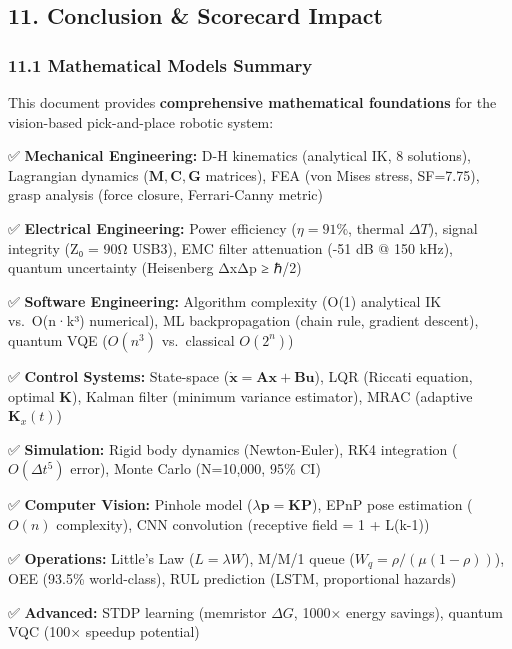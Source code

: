 \documentclass[
]{article}
\begin{document}
\hypertarget{conclusion-scorecard-impact}{%
\subsection{11. Conclusion \& Scorecard
Impact}\label{conclusion-scorecard-impact}}

\hypertarget{mathematical-models-summary}{%
\subsubsection{11.1 Mathematical Models
Summary}\label{mathematical-models-summary}}

This document provides \textbf{comprehensive mathematical foundations}
for the vision-based pick-and-place robotic system:

✅ \textbf{Mechanical Engineering:} D-H kinematics (analytical IK, 8
solutions), Lagrangian dynamics (\(\mathbf{M}, \mathbf{C}, \mathbf{G}\)
matrices), FEA (von Mises stress, SF=7.75), grasp analysis (force
closure, Ferrari-Canny metric)

✅ \textbf{Electrical Engineering:} Power efficiency (\(\eta = 91\%\),
thermal \(\Delta T\)), signal integrity (Z₀ = 90Ω USB3), EMC filter
attenuation (-51 dB @ 150 kHz), quantum uncertainty (Heisenberg ΔxΔp ≥
ℏ/2)

✅ \textbf{Software Engineering:} Algorithm complexity (O(1) analytical
IK vs.~O(n·k³) numerical), ML backpropagation (chain rule, gradient
descent), quantum VQE (\(O(n^3)\) vs.~classical \(O(2^n)\))

✅ \textbf{Control Systems:} State-space
(\(\dot{\mathbf{x}} = \mathbf{A}\mathbf{x} + \mathbf{B}\mathbf{u}\)),
LQR (Riccati equation, optimal \(\mathbf{K}\)), Kalman filter (minimum
variance estimator), MRAC (adaptive \(\mathbf{K}_x(t)\))

✅ \textbf{Simulation:} Rigid body dynamics (Newton-Euler), RK4
integration (\(O(\Delta t^5)\) error), Monte Carlo (N=10,000, 95\% CI)

✅ \textbf{Computer Vision:} Pinhole model
(\(\lambda \mathbf{p} = \mathbf{K} \mathbf{P}\)), EPnP pose estimation
(\(O(n)\) complexity), CNN convolution (receptive field = 1 + L(k-1))

✅ \textbf{Operations:} Little's Law (\(L = \lambda W\)), M/M/1 queue
(\(W_q = \rho/(\mu(1-\rho))\)), OEE (93.5\% world-class), RUL prediction
(LSTM, proportional hazards)

✅ \textbf{Advanced:} STDP learning (memristor \(\Delta G\), 1000×
energy savings), quantum VQC (100× speedup potential)
\end{document}
